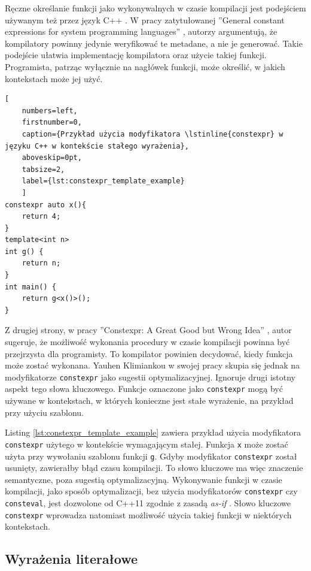 Ręczne określanie funkcji jako wykonywalnych w czasie kompilacji jest podejściem używanym też przez język C++ \cite{ISO:2012:III}.
W pracy zatytułowanej ''General constant expressions for system programming languages'' \cite{dos2010general_constant_expressions}, autorzy argumentują, że kompilatory powinny jedynie weryfikować te metadane, a nie je generować.
Takie podejście ułatwia implementację kompilatora oraz użycie takiej funkcji.
Programista, patrząc wyłącznie na nagłówek funkcji, może określić, w jakich kontekstach może jej użyć.

\begin{lstlisting}[
	numbers=left,
	firstnumber=0,
	caption={Przykład użycia modyfikatora \lstinline{constexpr} w języku C++ w kontekście stałego wyrażenia},
	aboveskip=0pt,
	tabsize=2,
	label={lst:constexpr_template_example}
	]
constexpr auto x(){ 
	return 4;
}
template<int n>
int g() {
	return n;
}
int main() {
	return g<x()>();
}
\end{lstlisting}

Z drugiej strony, w pracy ''Constexpr: A Great Good but Wrong Idea'' \cite{Klimiankou:contexpr_great_good_wrong_idea}, autor sugeruje, że możliwość wykonania procedury w czasie kompilacji powinna być przejrzysta dla programisty.
To kompilator powinien decydować, kiedy funkcja może zostać wykonana.
Yauhen Klimiankou w swojej pracy skupia się jednak na modyfikatorze \lstinline{constexpr} jako sugestii optymalizacyjnej.
Ignoruje drugi istotny aspekt tego słowa kluczowego.
Funkcje oznaczone jako \lstinline{constexpr} mogą być używane w kontekstach, w których konieczne jest stałe wyrażenie, na przykład przy użyciu szablonu.

Listing \ref{lst:constexpr_template_example} zawiera przykład użycia modyfikatora \lstinline{constexpr} użytego w kontekście wymagającym stałej.
Funkcja \lstinline{x} może zostać użyta przy wywołaniu szablonu funkcji \lstinline{g}.
Gdyby modyfikator \lstinline{constexpr} został usunięty, zawierałby błąd czasu kompilacji.
To słowo kluczowe ma więc znaczenie semantyczne, poza sugestią optymalizacyjną.
Wykonywanie funkcji w czasie kompilacji, jako sposób optymalizacji, bez użycia modyfikatorów \lstinline{constexpr} czy \lstinline{consteval}, jest dozwolone od C++11 zgodnie z zasadą \emph{as-if} \cite{ISO:2012:III}.
Słowo kluczowe \lstinline{constexpr} wprowadza natomiast możliwość użycia takiej funkcji w niektórych kontekstach.

\subsection{Wyrażenia literałowe}

